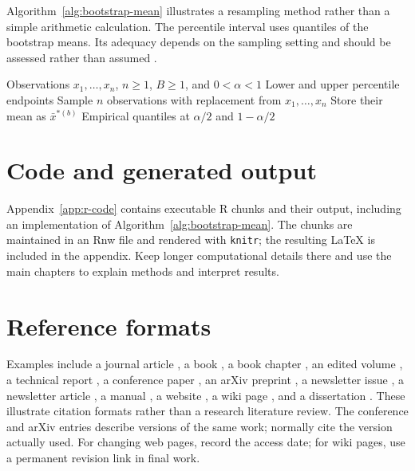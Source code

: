 Algorithm~\ref{alg:bootstrap-mean} illustrates a resampling method rather
than a simple arithmetic calculation. The percentile interval uses quantiles
of the bootstrap means. Its adequacy depends on the sampling setting and
should be assessed rather than assumed \citep{wasserman2004all}.
\begin{algorithm}[tbp]
  \caption{Percentile bootstrap interval for the mean}
  \label{alg:bootstrap-mean}
  \begin{algorithmic}[1]
    \Require Observations $x_1,\ldots,x_n$, $n\geq 1$, $B\geq 1$,
    and $0<\alpha<1$
    \Ensure Lower and upper percentile endpoints
      \State Sample $n$ observations with replacement from $x_1,\ldots,x_n$
      \State Store their mean as $\bar{x}^{*(b)}$
    \EndFor
    \State \Return Empirical quantiles at $\alpha/2$ and $1-\alpha/2$
  \end{algorithmic}
\end{algorithm}


\section{Code and generated output}
Appendix~\ref{app:r-code} contains executable R chunks and their output,
including an implementation of Algorithm~\ref{alg:bootstrap-mean}. The chunks
are maintained in an Rnw file and rendered with \texttt{knitr}; the resulting
LaTeX is included in the appendix. Keep longer computational details there
and use the main chapters to explain methods and interpret results.


\section{Reference formats}
Examples include a journal article \citep{morris2019using}, a book
\citep{wasserman2004all}, a book chapter \citep{neal2011mcmc}, an edited
volume
\citep{brooks2011handbook}, a technical report \citep{breiman1999random}, a
conference
paper \citep{vaswani2017attentiona}, an arXiv preprint
\citep{vaswani2017attentionb}, a newsletter issue \citep{rnews2001news}, a
newsletter
article \citep{hornik2001editorial}, a manual \citep{venables2026introduction},
a website
\citep{rfoundationndproject}, a wiki page \citep{wikipediandbibtex}, and a
dissertation \citep{efron1964problems}. These illustrate citation formats
rather
than a research literature review. The conference and arXiv entries describe
versions of the same work; normally cite the version actually used. For
changing web pages, record the access date; for wiki pages, use a permanent
revision link in final work.
